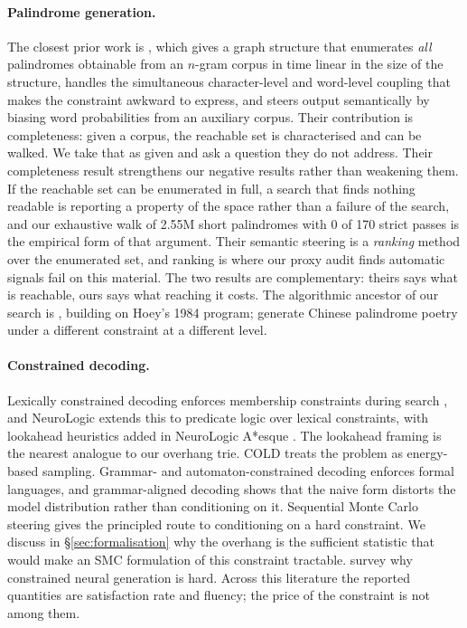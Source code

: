 \documentclass[11pt]{article}
\begin{document}
\paragraph{Palindrome generation.}
The closest prior work is \citet{papadopoulos2015}, which gives a graph
structure that enumerates \emph{all} palindromes obtainable from an $n$-gram
corpus in time linear in the size of the structure, handles the simultaneous
character-level and word-level coupling that makes the constraint awkward to
express, and steers output semantically by biasing word probabilities from an
auxiliary corpus. Their contribution is completeness: given a corpus, the
reachable set is characterised and can be walked. We take that as given and ask
a question they do not address. Their completeness result strengthens our
negative results rather than weakening them. If the reachable set can be
enumerated in full, a search that finds nothing readable is reporting a
property of the space rather than a failure of the search, and our exhaustive
walk of 2.55M short palindromes with 0 of 170 strict passes is the empirical
form of that argument. Their semantic steering is a \emph{ranking} method over
the enumerated set, and ranking is where our proxy audit finds automatic
signals fail on this material. The two results are complementary: theirs says
what is reachable, ours says what reaching it costs. The algorithmic ancestor
of our search is \citet{norvig2002}, building on Hoey's 1984 program;
\citet{cppgm2020} generate Chinese palindrome poetry under a different
constraint at a different level.

\paragraph{Constrained decoding.}
Lexically constrained decoding enforces membership constraints during search
\citep{hokamp2017,post2018}, and NeuroLogic \citep{lu2021} extends this to
predicate logic over lexical constraints, with lookahead heuristics added in
NeuroLogic A*esque \citep{lu2022}. The lookahead framing is the nearest
analogue to our overhang trie. COLD \citep{qin2022} treats the problem as
energy-based sampling. Grammar- and automaton-constrained decoding
\citep{willard2023,beurerkellner2024} enforces formal languages, and
grammar-aligned decoding \citep{park2024} shows that the naive form distorts
the model distribution rather than conditioning on it. Sequential Monte Carlo
steering \citep{lew2023,loula2025} gives the principled route to conditioning
on a hard constraint. We discuss in \S\ref{sec:formalisation} why the overhang
is the sufficient statistic that would make an SMC formulation of this
constraint tractable. \citet{garbacea2022} survey why constrained neural
generation is hard. Across this literature the reported quantities are
satisfaction rate and fluency; the price of the constraint is not among them.
\end{document}
